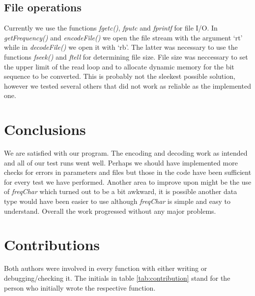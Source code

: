 \documentclass[a4paper,11pt,twoside]{article}
\begin{document}
\subsection{File operations}
Currently we use the functions \emph{fgetc()}, \emph{fputc} and
\emph{fprintf} for file I/O. In \emph{getFrequency()} and
\emph{encodeFile()} we open the file stream with the argument `rt'
while in \emph{decodeFile()} we open it with `rb'. The latter was
necessary to use the functions \emph{fseek()} and \emph{ftell} for
determining file size. File size was neccessary to set the upper 
limit of the read loop and to allocate dynamic memory
for the bit sequence to be converted. This is probably not the
sleekest possible solution, however we tested several others that 
did not work as reliable as the implemented one. 

\section{Conclusions}
We are satisfied with our program. The encoding and decoding work as
intended and all of our test runs went well. Perhaps we should have
implemented more checks for errors in parameters and files but those
in the code have been sufficient for every test we have
performed. Another area to improve upon might be the use of
\emph{freqChar} which turned out to be a bit awkward, it is possible
another data type would have been easier to use although
\emph{freqChar} is simple and easy to understand. Overall the work
progressed without any major problems. 

\section{Contributions}
Both authors were involved in every function with either writing or
debugging/checking it. The initials in table \ref{tab:contribution}
stand for the person who initially wrote the respective function.
\end{document}
